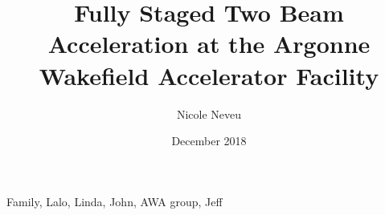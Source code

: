 \documentclass[table]{iitthesis}
\begin{document}
\title{Fully Staged Two Beam Acceleration at the Argonne Wakefield Accelerator Facility}

\author{Nicole Neveu }
\date{December 2018}
\copyrightnoticetrue      %
\maketitle                %


\prelimpages         %

\begin{acknowledgement}     %
	\par  Family, Lalo, Linda, John, AWA group, Jeff
\end{acknowledgement}

\tableofcontents
\clearpage

\listoftables
\clearpage

\listoffigures
\clearpage


\listofsymbols
{}

\clearpage
\end{document}
